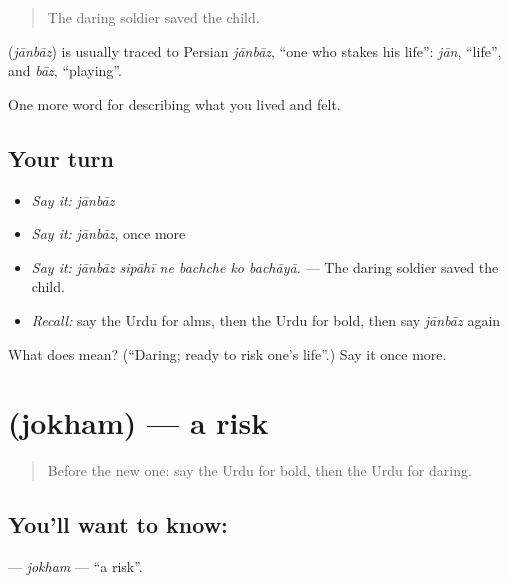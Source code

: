 \begin{quote}
The daring soldier saved the child.
\end{quote}

\begin{cousinweb}
\textbf{} (\emph{jānbāz}) is usually traced to Persian \emph{jānbāz}, \textquotedblleft{}one who stakes his life\textquotedblright{}: \emph{jān}, \textquotedblleft{}life\textquotedblright{}, and \emph{bāz}, \textquotedblleft{}playing\textquotedblright{}.
\end{cousinweb}

\begin{grammarlens}[title={What you've built}]
One more word for describing what you lived and felt.
\end{grammarlens}

\subsection*{Your turn}
\begin{itemize}
\raggedright
  \item \emph{Say it:} \emph{jānbāz}
  \item \emph{Say it:} \emph{jānbāz}, once more
  \item \emph{Say it:} \emph{jānbāz sipāhī ne bachche ko bachāyā.} — The daring soldier saved the child.
  \item \emph{Recall:} say the Urdu for alms, then the Urdu for bold, then say \emph{jānbāz} again
\end{itemize}

\begin{tcolorbox}[breakable,colback=teal!4,colframe=teal!35!black,title={Before you move on}]
What does  mean? (\textquotedblleft{}Daring; ready to risk one's life\textquotedblright{}.) Say it once more.
\end{tcolorbox}
\section[\texorpdfstring{\ur{جوکھم} (jokham)}{جوکھم (jokham)}]{ (jokham) — a risk}

\label{lesson:UR-C460-jokham}



\begin{quote}
Before the new one: say the Urdu for bold, then the Urdu for daring.
\end{quote}

\subsection*{You'll want to know: }
\textbf{} — \emph{jokham} — \textquotedblleft{}a risk\textquotedblright{}.

